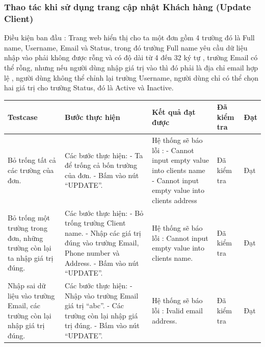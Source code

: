 \documentclass{article}
\begin{document}
\subsubsection{Thao tác khi sử dụng trang cập nhật Khách hàng (Update Client) }
Điều kiện ban đầu : Trang web hiển thị cho ta một đơn gồm 4 trường đó là Full name, Username, Email và Status, trong đó trường Full name yêu cầu dữ liệu nhập vào phải không được rỗng và có độ dài từ 4 đến 32 ký tự , trường Email có thể rỗng, nhưng nếu người dùng nhập giá trị vào thì đó phải là địa chỉ email hợp lệ , người dùng không thể chỉnh lại trường Username, người dùng chỉ có thể chọn hai giá trị cho trường Status, đó là Active và Inactive.  \newline
\begin{longtable}{ | p{} |p{} | p{}  | p{}  | p{}  | } 
\hline
\textbf{Testcase}& \textbf{Bước thực hiện}& \textbf{Kết quả đạt được} & \textbf{Đã kiểm tra}& \textbf{Đạt} \\ 
\hline
\hline
Bỏ trống tất cả các trường của đơn. &
Các bước thực hiện: \newline
- Ta để trống cả bốn trường của đơn. \newline
- Bấm vào nút “UPDATE”.
&
Hệ thống sẽ báo lỗi :  \newline
- Cannot input empty value into clients name \newline
- Cannot input empty value into clients address
&
Đã kiểm tra &
Đạt \\

\hline
Bỏ trống một trường trong đơn, những trường còn lại ta nhập giá trị đúng. &
Các bước thực hiện: \newline
- Bỏ trống trường Client name.  \newline
- Nhập các giá trị đúng vào trường Email, Phone number và Address. \newline
- Bấm vào nút “UPDATE”.
&
Hệ thống sẽ báo lỗi :  Cannot input empty value into clients name.
&
Đã kiểm tra &
Đạt \\

\hline
Nhập sai dữ liệu vào trường Email, các trường còn lại nhập giá trị đúng. &
Các bước thực hiện: \newline
- Nhập vào trường Email giá trị  “abc”.  \newline
- Các trường còn lại nhập giá trị đúng. \newline
- Bấm vào nút “UPDATE”.
&
Hệ thống sẽ báo lỗi :  Ivalid email address.
&
Đã kiểm tra &
Đạt \\


\end{longtable}
\end{document}

